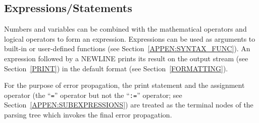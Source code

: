\documentclass[11pt]{article}
\begin{document}

\subsection{Expressions/Statements}
\label{APPEN:SYNTAX_EXPR}

Numbers and variables can be combined with the mathematical operators
and logical operators to form an expression.  Expressions can be used
as arguments to built-in or user-defined functions (see
Section~\ref{APPEN:SYNTAX_FUNC}).  An expression followed by a NEWLINE
prints its result on the output stream (see Section~\ref{PRINT}) in
the default format (see Section~\ref{FORMATTING}).

For the purpose of error propagation, the print statement and the
assignment operator (the ``{\tt =}'' operator but not the ``{\tt :=}''
operator; see Section~\ref{APPEN:SUBEXPRESSIONS}) are treated as the
terminal nodes of the parsing tree which invokes the final error
propagation.
\end{document}
